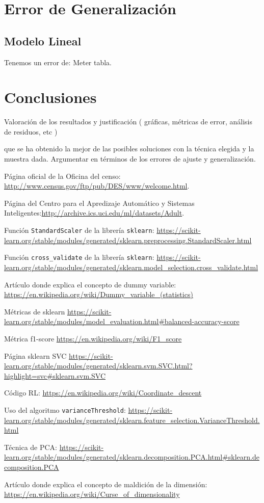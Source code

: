 \documentclass[11pt,a4paper]{article}
\begin{document}
\section{ Error de Generalización}
\subsection{Modelo Lineal}

Tenemos un error de: Meter tabla.


\section{ Conclusiones }
Valoración de los resultados y justificación
( gráficas, métricas de error, análisis de residuos, etc )


que se ha obtenido la mejor de las posibles soluciones con la técnica elegida y la muestra dada. Argumentar en términos de los errores de ajuste y generalización. 


\newpage
\begin{thebibliography}{9}
Página oficial de la Oficina del censo: \url{http://www.census.gov/ftp/pub/DES/www/welcome.html}.

Página del Centro para el Apredizaje Automático y Sistemas Inteligentes:\url{http://archive.ics.uci.edu/ml/datasets/Adult}.

Función \texttt{StandardScaler} de la librería \texttt{sklearn}: \url{https://scikit-learn.org/stable/modules/generated/sklearn.preprocessing.StandardScaler.html}

Función \texttt{cross\_validate} de la librería \texttt{sklearn}:
\url{https://scikit-learn.org/stable/modules/generated/sklearn.model_selection.cross_validate.html}

Artículo donde explica el concepto de dummy variable: \url{https://en.wikipedia.org/wiki/Dummy_variable_(statistics)}

Métricas de sklearn \url{https://scikit-learn.org/stable/modules/model_evaluation.html#balanced-accuracy-score}


Métrica f1-score \url{https://en.wikipedia.org/wiki/F1_score}


Página sklearn SVC \url{https://scikit-learn.org/stable/modules/generated/sklearn.svm.SVC.html?highlight=svc#sklearn.svm.SVC}

Código RL: \url{https://en.wikipedia.org/wiki/Coordinate_descent}


Uso del algoritmo \texttt{varianceThreshold}: \url{https://scikit-learn.org/stable/modules/generated/sklearn.feature_selection.VarianceThreshold.html}

Técnica de PCA: 
\url{https://scikit-learn.org/stable/modules/generated/sklearn.decomposition.PCA.html#sklearn.decomposition.PCA}

Artículo donde explica el concepto de maldición de la dimensión: \url{https://en.wikipedia.org/wiki/Curse_of_dimensionality}


\end{thebibliography}
\end{document}
